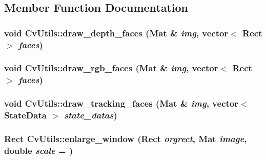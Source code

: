 \subsection{Member Function Documentation}
\hypertarget{classCvUtils_a6e1f3369c2b553c06f2692c75e20667d}{
\subsubsection[{draw\_\-depth\_\-faces}]{\setlength{\rightskip}{0pt plus 5cm}void CvUtils::draw\_\-depth\_\-faces (Mat \& {\em img}, \/  vector$<$ Rect $>$ {\em faces})}}
\label{classCvUtils_a6e1f3369c2b553c06f2692c75e20667d}
\hypertarget{classCvUtils_a74249b2e9b76b2a8ae2c01c4ff496663}{
\subsubsection[{draw\_\-rgb\_\-faces}]{\setlength{\rightskip}{0pt plus 5cm}void CvUtils::draw\_\-rgb\_\-faces (Mat \& {\em img}, \/  vector$<$ Rect $>$ {\em faces})}}
\label{classCvUtils_a74249b2e9b76b2a8ae2c01c4ff496663}
\hypertarget{classCvUtils_ac86c2ad8adca706655831938b63ebaa2}{
\subsubsection[{draw\_\-tracking\_\-faces}]{\setlength{\rightskip}{0pt plus 5cm}void CvUtils::draw\_\-tracking\_\-faces (Mat \& {\em img}, \/  vector$<$ {\bf StateData} $>$ {\em state\_\-datas})}}
\label{classCvUtils_ac86c2ad8adca706655831938b63ebaa2}
\hypertarget{classCvUtils_a349894b926e2d252d0ce224abcba698a}{
\subsubsection[{enlarge\_\-window}]{\setlength{\rightskip}{0pt plus 5cm}Rect CvUtils::enlarge\_\-window (Rect {\em orgrect}, \/  Mat {\em image}, \/  double {\em scale} = {})}}
\label{classCvUtils_a349894b926e2d252d0ce224abcba698a}
